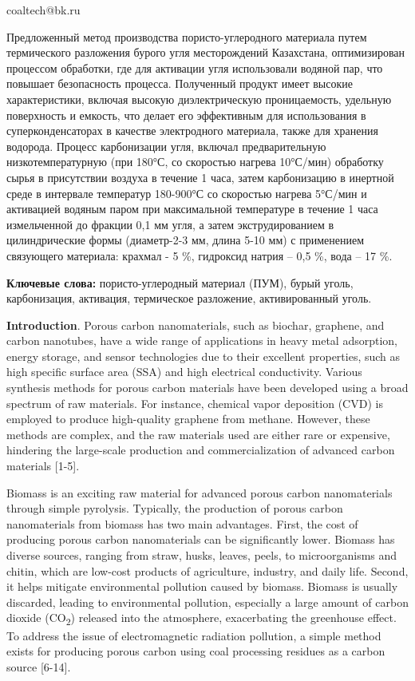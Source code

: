coaltech@bk.ru

Предложенный метод производства пористо-углеродного материала путем
термического разложения бурого угля месторождений Казахстана,
оптимизирован процессом обработки, где для активации угля использовали
водяной пар, что повышает безопасность процесса. Полученный продукт
имеет высокие характеристики, включая высокую диэлектрическую
проницаемость, удельную поверхность и емкость, что делает его
эффективным для использования в суперконденсаторах в качестве
электродного материала, также для хранения водорода. Процесс
карбонизации угля, включал предварительную низкотемпературную (при
180°С, со скоростью нагрева 10°С/мин) обработку сырья в присутствии
воздуха в течение 1 часа, затем карбонизацию в инертной среде в
интервале температур 180-900°С со скоростью нагрева 5°С/мин и активацией
водяным паром при максимальной температуре в течение 1 часа измельченной
до фракции 0,1 мм угля, а затем экструдированием в цилиндрические формы
(диаметр-2-3 мм, длина 5-10 мм) с применением связующего материала:
крахмал - 5 \%, гидроксид натрия -- 0,5 \%, вода -- 17 \%.

\textbf{Ключевые слова:} пористо-углеродный материал (ПУМ), бурый уголь,
карбонизация, активация, термическое разложение, активированный уголь.

\textbf{Introduction}. Porous carbon nanomaterials, such as biochar,
graphene, and carbon nanotubes, have a wide range of applications in
heavy metal adsorption, energy storage, and sensor technologies due to
their excellent properties, such as high specific surface area (SSA) and
high electrical conductivity. Various synthesis methods for porous
carbon materials have been developed using a broad spectrum of raw
materials. For instance, chemical vapor deposition (CVD) is employed to
produce high-quality graphene from methane. However, these methods are
complex, and the raw materials used are either rare or expensive,
hindering the large-scale production and commercialization of advanced
carbon materials {[}1-5{]}.

Biomass is an exciting raw material for advanced porous carbon
nanomaterials through simple pyrolysis. Typically, the production of
porous carbon nanomaterials from biomass has two main advantages. First,
the cost of producing porous carbon nanomaterials can be significantly
lower. Biomass has diverse sources, ranging from straw, husks, leaves,
peels, to microorganisms and chitin, which are low-cost products of
agriculture, industry, and daily life. Second, it helps mitigate
environmental pollution caused by biomass. Biomass is usually discarded,
leading to environmental pollution, especially a large amount of carbon
dioxide (CO\textsubscript{2}) released into the atmosphere, exacerbating
the greenhouse effect. To address the issue of electromagnetic radiation
pollution, a simple method exists for producing porous carbon using coal
processing residues as a carbon source {[}6-14{]}.

